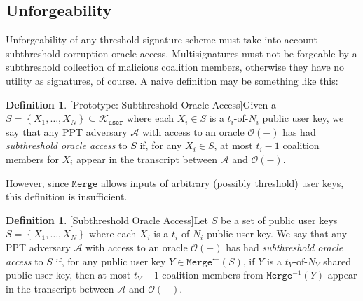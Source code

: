 \documentclass{mrl}
\theoremstyle{definition}
\newtheorem{defn}[theorem]{Definition}
\begin{document}
\subsection{Unforgeability}
 

Unforgeability of any threshold signature scheme must take into account subthreshold corruption oracle access. Multisignatures must not be forgeable by a subthreshold collection of malicious coalition members, otherwise they have no utility as signatures, of course. A naive definition may be something like this:

\begin{defn}{[Prototype: Subthreshold Oracle Access]}\label{def:prot:subthresh}
Given a $S = \left\{X_1, \ldots, X_N\right\} \subseteq \mathcal{K}_{\texttt{user}}$ where each $X_i \in S$ is a $t_i$-of-$N_i$ public user key, we say that any PPT adversary $\mathcal{A}$ with access to an oracle $\mathcal{O}(-)$ has had \textit{subthreshold oracle access} to $S$ if, for any $X_i \in S$, at most $t_{i}-1$ coalition members for $X_i$ appear in the transcript between $\mathcal{A}$ and $\mathcal{O}(-)$.
\end{defn}

However, since $\texttt{Merge}$ allows inputs of arbitrary (possibly threshold) user keys, this definition is insufficient. %

\begin{defn}{[Subthreshold Oracle Access]}\label{def:prot:subthresh}
Let $S$ be a set of public user keys $S = \left\{X_1, \ldots, X_N\right\}$ where each $X_i$ is a $t_i$-of-$N_i$ public user key. We say that any PPT adversary $\mathcal{A}$ with access to an oracle $\mathcal{O}(-)$ has had \textit{subthreshold oracle access} to $S$ if, for any public user key $Y \in \texttt{Merge}^{\leftarrow}(S)$, if $Y$ is a $t_Y$-of-$N_Y$ shared public user key, then at most $t_{Y}-1$ coalition members from $\texttt{Merge}^{-1}(Y)$ appear in the transcript between $\mathcal{A}$ and $\mathcal{O}(-)$.
\end{defn}
\end{document}
